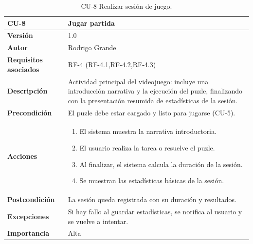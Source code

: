 \begin{table}[p]
	\centering
	\begin{tabularx}{\linewidth}{ p{} p{} }
		\toprule
		\textbf{CU-8} & \textbf{Jugar partida}\\
		\toprule
		\textbf{Versión}              & 1.0    \\
		\textbf{Autor}                & Rodrigo Grande \\
		\textbf{Requisitos asociados} & RF-4 (RF-4.1,RF-4.2,RF-4.3) \\
		\textbf{Descripción}          & Actividad principal del videojuego: incluye una introducción narrativa y la ejecución del puzle, finalizando con la presentación resumida de estadísticas de la sesión.\\
		\textbf{Precondición}         & El puzle debe estar cargado y listo para jugarse (CU-5). \\
		\textbf{Acciones}             &
		\begin{enumerate}
			\def\labelenumi{\arabic{enumi}.}
			\tightlist
			\item El sistema muestra la narrativa introductoria.
			\item El usuario realiza la tarea o resuelve el puzle.
			\item Al finalizar, el sistema calcula la duración de la sesión.
			\item Se muestran las estadísticas básicas de la sesión.
		\end{enumerate}\\
		\textbf{Postcondición}        & La sesión queda registrada con su duración y resultados. \\
		\textbf{Excepciones}          & Si hay fallo al guardar estadísticas, se notifica al usuario y se vuelve a intentar. \\
		\textbf{Importancia}          & Alta \\
		\bottomrule
	\end{tabularx}
	\caption{CU-8 Realizar sesión de juego.}
	\label{cu:jugar-partida}
\end{table}

